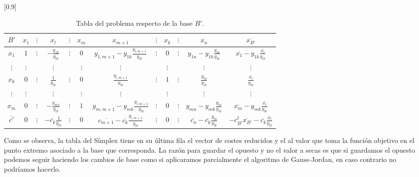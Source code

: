 \begin{table}[H]
	\centering
	\scalebox{0.9}[0.9]{
	\begin{tabular}{c|cccccccccc|c}
		$B'$           & $x_1$    & $\vdots$ & $x_l$                             & $\vdots$ & $x_m$    & $x_{m+1}$                                                   & $\vdots$ & $x_k$    & $\vdots$ & $x_n$                                                & $\overline{x_{B'}}$                                                      \\ \hline
		$x_1$          & $1$      & $\vdots$ & $-\frac{y_{1k}}{y_{lk}}$          & $\vdots$ & $0$      & $y_{1,m+1}-y_{1k}\frac{y_{l,m+1}}{y_{lk}}$                  & $\vdots$ & $0$      & $\vdots$ & $y_{1n}-y_{1k}\frac{y_{ln}}{y_{lk}}$                 & $\overline{x_1}-y_{1k}\frac{\overline{x_l}}{y_{lk}}$                     \\
		$\vdots$       & $\vdots$ &          & $\vdots$                          &          & $\vdots$ & $\vdots$                                                    &          & $\vdots$ &          & $\vdots$                                             & $\vdots$                                                                 \\
		$x_k$          & $0$      & $\vdots$ & $\frac{1}{y_{lk}}$                & $\vdots$ & $0$      & $\frac{y_{l,m+1}}{y_{lk}}$                                  & $\vdots$ & $1$      & $\vdots$ & $\frac{y_{ln}}{y_{lk}}$                              & $\frac{\overline{x_l}}{y_{lk}}$                                          \\
		$\vdots$       & $\vdots$ &          & $\vdots$                          &          & $\vdots$ & $\vdots$                                                    &          & $\vdots$ &          & $\vdots$                                             & $\vdots$                                                                 \\
		$x_m$          & $0$      & $\vdots$ & $-\frac{y_{mk}}{y_{lk}}$          & $\vdots$ & $1$      & $y_{m,m+1}-y_{mk}\frac{y_{l,m+1}}{y_{lk}}$                  & $\vdots$ & $0$      & $\vdots$ & $y_{mn}-y_{mk}\frac{y_{ln}}{y_{kl}}$                 & $\overline{x_m}-y_{mk}\frac{\overline{x_l}}{y_{lk}}$                     \\ \hline
		$\overline{c'}$ & $0$      & $\vdots$ & $-\overline{c_k}\frac{1}{y_{lk}}$ & $\vdots$ & $0$      & $\overline{c_{m+1}}-\overline{c_k}\frac{y_{l,m+1}}{y_{lk}}$ & $\vdots$ & $0$      & $\vdots$ & $\overline{c_n}-\overline{c_k}\frac{y_{ln}}{y_{lk}}$ & $-c_{B'}^t\overline{x_{B'}}-\overline{c_k}\frac{\overline{x_l}}{y_{lk}}$
	\end{tabular}}
	\caption{Tabla del problema respecto de la base $B'$.}
\end{table}
Como se observa, la tabla del Símplex tiene en su última fila el vector de costes reducidos y el  al valor que toma la función objetivo en el punto extremo asociado a la base que corresponda. La razón para guardar el opuesto y no el valor a secas es que si guardamos el opuesto podemos seguir haciendo los cambios de base como si aplicaramos parcialmente el algoritmo de Gauss-Jordan, en caso contrario no podríamos hacerlo.

